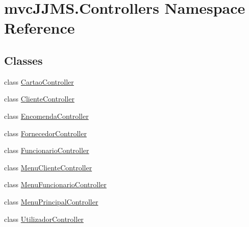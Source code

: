 \hypertarget{namespacemvc_j_j_m_s_1_1_controllers}{}\section{mvc\+J\+J\+M\+S.\+Controllers Namespace Reference}
\label{namespacemvc_j_j_m_s_1_1_controllers}
\subsection*{Classes}
\begin{DoxyCompactItemize}
\item 
class \mbox{\hyperlink{classmvc_j_j_m_s_1_1_controllers_1_1_cartao_controller}{Cartao\+Controller}}
\item 
class \mbox{\hyperlink{classmvc_j_j_m_s_1_1_controllers_1_1_cliente_controller}{Cliente\+Controller}}
\item 
class \mbox{\hyperlink{classmvc_j_j_m_s_1_1_controllers_1_1_encomenda_controller}{Encomenda\+Controller}}
\item 
class \mbox{\hyperlink{classmvc_j_j_m_s_1_1_controllers_1_1_fornecedor_controller}{Fornecedor\+Controller}}
\item 
class \mbox{\hyperlink{classmvc_j_j_m_s_1_1_controllers_1_1_funcionario_controller}{Funcionario\+Controller}}
\item 
class \mbox{\hyperlink{classmvc_j_j_m_s_1_1_controllers_1_1_menu_cliente_controller}{Menu\+Cliente\+Controller}}
\item 
class \mbox{\hyperlink{classmvc_j_j_m_s_1_1_controllers_1_1_menu_funcionario_controller}{Menu\+Funcionario\+Controller}}
\item 
class \mbox{\hyperlink{classmvc_j_j_m_s_1_1_controllers_1_1_menu_principal_controller}{Menu\+Principal\+Controller}}
\item 
class \mbox{\hyperlink{classmvc_j_j_m_s_1_1_controllers_1_1_utilizador_controller}{Utilizador\+Controller}}
\end{DoxyCompactItemize}
